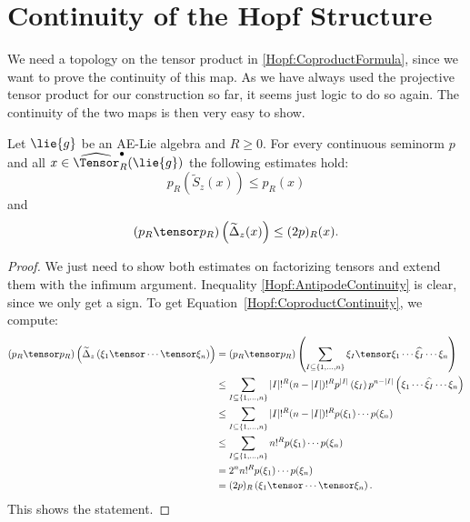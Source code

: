 \section{Continuity of the Hopf Structure}
We need a topology on the tensor product in \eqref{Hopf:CoproductFormula},
since we want to prove the continuity of this map. As we have always used the 
projective tensor product for our construction so far, it seems just logic to do 
so again. The continuity of the two maps is then very easy to show.
\begin{proposition}
    \label{Prop:Hopf:CoproductContinuity}%
    Let $\lie{g}$ be an AE-Lie algebra and $R \geq 0$. For every continuous 
    seminorm $p$ and all $x \in \widehat{\Tensor}_R^\bullet(\lie{g})$
    the following estimates hold:
    \begin{equation}
        \label{Hopf:AntipodeContinuity}
        p_R \left( \widetilde{S}_z(x) \right)
        \leq
        p_R (x)
    \end{equation}
    and
    \begin{equation}
        \label{Hopf:CoproductContinuity}
        (p_R \tensor p_R)
        \left( \widetilde{\ocoproduct}_z(x) \right)
        \leq
        (2 p)_R (x).
    \end{equation}
\end{proposition}
\begin{proof}
	We just need to show both estimates on factorizing tensors and extend them 
	with the infimum argument. Inequality \eqref{Hopf:AntipodeContinuity} is 
	clear, since we only get a sign.
	To get Equation~\eqref{Hopf:CoproductContinuity}, we compute:
	\begin{align*}
		(p_R \tensor p_R)
        \left( \widetilde{\ocoproduct}_z
        	\left(
        		\xi_1 \tensor \cdots \tensor \xi_n
        	\right)
        \right)
        & =
		(p_R \tensor p_R)
        \left( 
			\sum\limits_{
        		I \subseteq
        		\{1, \ldots, n\}
        	}
        	\xi_I
        	\tensor
        	\xi_1 \cdots
        	\widehat{\xi_I}
        	\cdots \xi_n
        \right)
        \\
        & \leq
        \sum\limits_{
        	I \subseteq
        	\{1, \ldots, n\}
        }
        |I|!^R (n - |I|)!^R
        p^{|I|} \left( \xi_I \right)
        p^{n - |I|}
        \left( 
        	\xi_1 \cdots \widehat{\xi_I} \cdots \xi_n 
        \right)
        \\
        & \leq
        \sum\limits_{
        	I \subseteq
        	\{1, \ldots, n\}
        }
        |I|!^R (n - |I|)!^R
        p(\xi_1) \cdots p(\xi_n)
        \\
        & \leq
        \sum\limits_{
        	I \subseteq
        	\{1, \ldots, n\}
        }
        n!^R
        p(\xi_1) \cdots p(\xi_n)
        \\
        & =
        2^n n!^R
        p(\xi_1) \cdots p(\xi_n)
        \\
        & =
        (2p)_R \left(
        	\xi_1 \tensor \cdots \tensor \xi_n
        \right).
	\end{align*}
	This shows the statement.
\end{proof}
